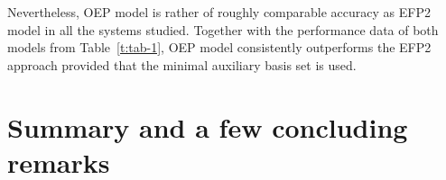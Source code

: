 %
%
%
% 
%
Nevertheless,
OEP model is rather of roughly comparable accuracy as EFP2 model in all the systems studied.
Together with the performance data of both models
from Table~\ref{t:tab-1}, OEP model consistently outperforms the
EFP2 approach provided
that the minimal auxiliary basis set is used.

\section{\label{s:6.conclusions}Summary and a few concluding remarks}

